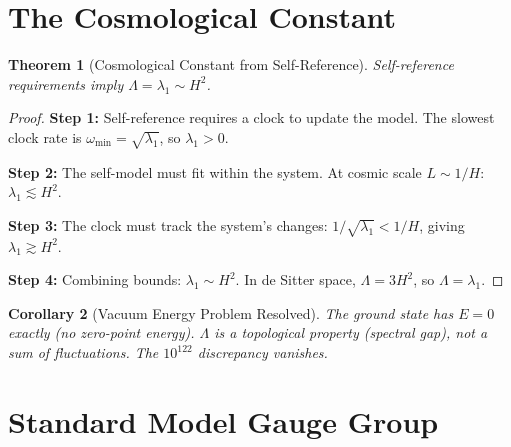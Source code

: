 \documentclass[11pt,a4paper]{article}
\theoremstyle{plain}
\newtheorem{theorem}{Theorem}[section]
\newtheorem{corollary}[theorem]{Corollary}
\theoremstyle{definition}
\theoremstyle{remark}
\begin{document}
\section{The Cosmological Constant}

\begin{theorem}[Cosmological Constant from Self-Reference]
Self-reference requirements imply $\Lambda = \lambda_1 \sim H^2$.
\end{theorem}

\begin{proof}
\textbf{Step 1:} Self-reference requires a clock to update the model. The slowest clock rate is $\omega_{\min} = \sqrt{\lambda_1}$, so $\lambda_1 > 0$.

\textbf{Step 2:} The self-model must fit within the system. At cosmic scale $L \sim 1/H$: $\lambda_1 \lesssim H^2$.

\textbf{Step 3:} The clock must track the system's changes: $1/\sqrt{\lambda_1} < 1/H$, giving $\lambda_1 \gtrsim H^2$.

\textbf{Step 4:} Combining bounds: $\lambda_1 \sim H^2$. In de Sitter space, $\Lambda = 3H^2$, so $\Lambda = \lambda_1$.
\end{proof}

\begin{corollary}[Vacuum Energy Problem Resolved]
The ground state has $E = 0$ exactly (no zero-point energy). $\Lambda$ is a topological property (spectral gap), not a sum of fluctuations. The $10^{122}$ discrepancy vanishes.
\end{corollary}

\section{Standard Model Gauge Group}
\end{document}
